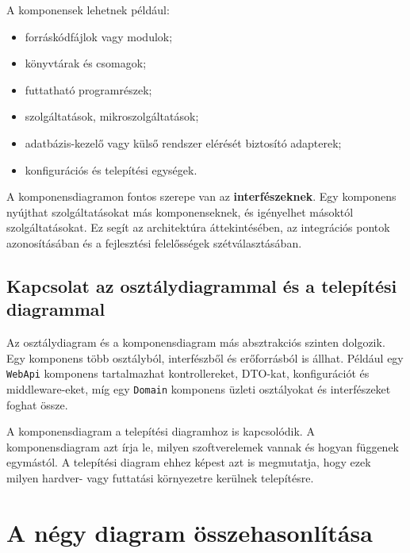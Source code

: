 \begin{center}

\end{center}



A komponensek lehetnek például:

\begin{itemize}
  \item forráskódfájlok vagy modulok;
  \item könyvtárak és csomagok;
  \item futtatható programrészek;
  \item szolgáltatások, mikroszolgáltatások;
  \item adatbázis-kezelő vagy külső rendszer elérését biztosító adapterek;
  \item konfigurációs és telepítési egységek.
\end{itemize}

A komponensdiagramon fontos szerepe van az \textbf{interfészeknek}. Egy komponens nyújthat szolgáltatásokat más komponenseknek, és igényelhet másoktól szolgáltatásokat. Ez segít az architektúra áttekintésében, az integrációs pontok azonosításában és a fejlesztési felelősségek szétválasztásában.

\subsection{Kapcsolat az osztálydiagrammal és a telepítési diagrammal}

Az osztálydiagram és a komponensdiagram más absztrakciós szinten dolgozik. Egy komponens több osztályból, interfészből és erőforrásból is állhat. Például egy \texttt{WebApi} komponens tartalmazhat kontrollereket, DTO-kat, konfigurációt és middleware-eket, míg egy \texttt{Domain} komponens üzleti osztályokat és interfészeket foghat össze.

A komponensdiagram a telepítési diagramhoz is kapcsolódik. A komponensdiagram azt írja le, milyen szoftverelemek vannak és hogyan függenek egymástól. A telepítési diagram ehhez képest azt is megmutatja, hogy ezek milyen hardver- vagy futtatási környezetre kerülnek telepítésre.

\section{A négy diagram összehasonlítása}

\begin{center}

\end{center}

